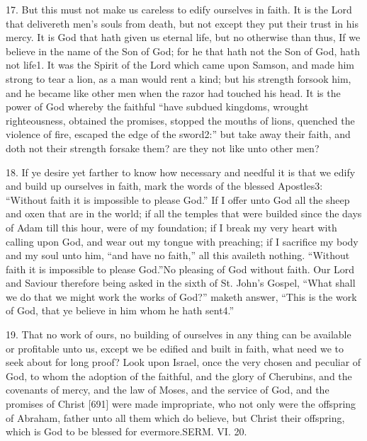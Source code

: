 17. But this must not make us careless to edify ourselves in faith. It is the Lord that delivereth men’s souls from death, but not except they put their trust in his mercy. It is God that hath given us eternal life, but no otherwise than thus, If we believe in the name of the Son of God; for he that hath not the Son of God, hath not life1. It was the Spirit of the Lord which came upon Samson, and made him strong to tear a lion, as a man would rent a kind; but his strength forsook him, and he became like other men when the razor had touched his head. It is the power of God whereby the faithful “have subdued kingdoms, wrought righteousness, obtained the promises, stopped the mouths of lions, quenched the violence of fire, escaped the edge of the sword2:” but take away their faith, and doth not their strength forsake them? are they not like unto other men?

18. If ye desire yet farther to know how necessary and needful it is that we edify and build up ourselves in faith, mark the words of the blessed Apostles3: “Without faith it is impossible to please God.” If I offer unto God all the sheep and oxen that are in the world; if all the temples that were builded since the days of Adam till this hour, were of my foundation; if I break my very heart with calling upon God, and wear out my tongue with preaching; if I sacrifice my body and my soul unto him, “and have no faith,” all this availeth nothing. “Without faith it is impossible to please God.”No pleasing of God without faith. Our Lord and Saviour therefore being asked in the sixth of St. John’s Gospel, “What shall we do that we might work the works of God?” maketh answer, “This is the work of God, that ye believe in him whom he hath sent4.”

19. That no work of ours, no building of ourselves in any thing can be available or profitable unto us, except we be edified and built in faith, what need we to seek about for long proof? Look upon Israel, once the very chosen and peculiar of God, to whom the adoption of the faithful, and the glory of Cherubins, and the covenants of mercy, and the law of Moses, and the service of God, and the promises of Christ [691] were made impropriate, who not only were the offspring of Abraham, father unto all them which do believe, but Christ their offspring, which is God to be blessed for evermore.SERM. VI. 20.

